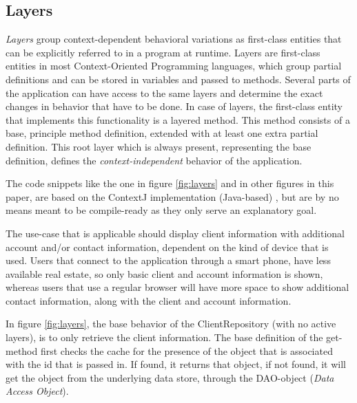 \documentclass{acm_proc_article-sp}
\begin{document}
\subsection{Layers}
\label{sec:layers}
\textit{Layers} group context-dependent behavioral variations as first-class entities that can be explicitly referred to in a program at runtime. Layers are first-class entities in most Context-Oriented Programming languages, which group partial definitions and can be stored in variables and passed to methods. Several parts of the application can have access to the same layers and determine the exact changes in behavior that have to be done. In case of layers, the first-class entity that implements this functionality is a layered method. This method consists of a base, principle method definition, extended with at least one extra partial definition. This root layer which is always present, representing the base definition, defines the \textit{context-independent} behavior of the application.

The code snippets like the one in figure \ref{fig:layers} and in other figures in this paper, are based on the ContextJ implementation (Java-based) \cite{Appeltauer:2009:IDC:1562112.1562117}, but are by no means meant to be compile-ready as they only serve an explanatory goal. 

The use-case that is applicable should display client information with additional account and/or contact information, dependent on the kind of device that is used. Users that connect to the application through a smart phone, have less available real estate, so only basic client and account information is shown, whereas users that use a regular browser will have more space to show additional contact information, along with the client and account information. 

In figure \ref{fig:layers}, the base behavior of the ClientRepository (with no active layers), is to only retrieve the client information. The base definition of the get-method first checks the cache for the presence of the object that is associated with the id that is passed in. If found, it returns that object, if not found, it will get the object from the underlying data store, through the DAO-object (\textit{Data Access Object}). 
\end{document}
